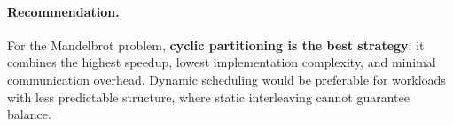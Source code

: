 \documentclass[11pt,a4paper]{article}
\begin{document}
\paragraph{Recommendation.} For the Mandelbrot problem, \textbf{cyclic
partitioning is the best strategy}: it combines the highest speedup, lowest
implementation complexity, and minimal communication overhead. Dynamic
scheduling would be preferable for workloads with less predictable
structure, where static interleaving cannot guarantee balance.
\end{document}
